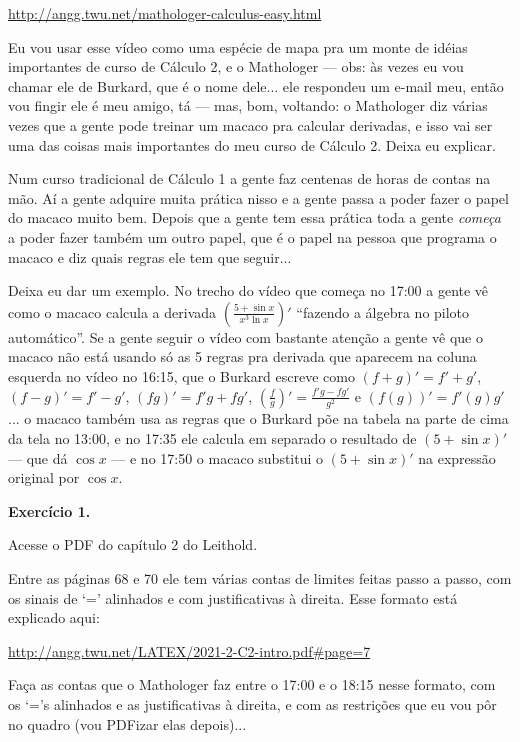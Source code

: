 \documentclass[oneside,12pt]{article}
\begin{document}
\url{http://angg.twu.net/mathologer-calculus-easy.html}

\ssk

Eu vou usar esse vídeo como uma espécie de mapa pra um monte de idéias
importantes de curso de Cálculo 2, e o Mathologer --- obs: às vezes eu
vou chamar ele de Burkard, que é o nome dele... ele respondeu um
e-mail meu, então vou fingir ele é meu amigo, tá {\smile} --- mas,
bom, voltando: o Mathologer diz várias vezes que a gente pode treinar
um macaco pra calcular derivadas, e isso vai ser uma das coisas mais
importantes do meu curso de Cálculo 2. Deixa eu explicar.

Num curso tradicional de Cálculo 1 a gente faz centenas de horas de
contas na mão. Aí a gente adquire muita prática nisso e a gente passa
a poder fazer o papel do macaco muito bem. Depois que a gente tem essa
prática toda a gente {\sl começa} a poder fazer também um outro papel,
que é o papel na pessoa que programa o macaco e diz quais regras ele
tem que seguir...

Deixa eu dar um exemplo. No trecho do vídeo que começa no 17:00 a
gente vê como o macaco calcula a derivada
$\left(\frac{5+\sin x}{x^3 \ln x}\right)'$ ``fazendo a álgebra no
piloto automático''. Se a gente seguir o vídeo com bastante atenção a
gente vê que o macaco não está usando só as 5 regras pra derivada que
aparecem na coluna esquerda no vídeo no 16:15, que o Burkard escreve
como $(f+g)' = f'+g'$, $(f-g)' = f'-g'$, $(fg)' = f'g + fg'$,
$(\frac{f}{g})' = \frac{f'g-fg'}{g^2}$ e $(f(g))' = f'(g)g'$... o
macaco também usa as regras que o Burkard põe na tabela na parte de
cima da tela no 13:00, e no 17:35 ele calcula em separado o resultado
de $(5 + \sin x)'$ --- que dá $\cos x$ --- e no 17:50 o macaco
substitui o $(5 + \sin x)'$ na expressão original por $\cos x$.


\newpage

{\bf Exercício 1.}

Acesse o PDF do capítulo 2 do Leithold.

Entre as páginas 68 e 70 ele tem várias contas de limites feitas passo
a passo, com os sinais de `=' alinhados e com justificativas à
direita. Esse formato está explicado aqui:

\ssk

{\footnotesize

\url{http://angg.twu.net/LATEX/2021-2-C2-intro.pdf#page=7}

}

\ssk

Faça as contas que o Mathologer faz entre o 17:00 e o 18:15 nesse
formato, com os `='s alinhados e as justificativas à direita, e com as
restrições que eu vou pôr no quadro (vou PDFizar elas depois)...





\end{document}
